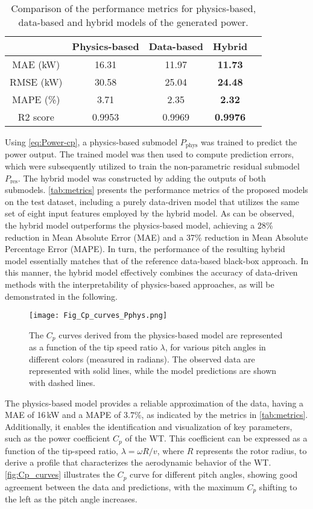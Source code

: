 \documentclass[preprint,12pt]{elsarticle}
\begin{document}
\begin{table}[t]
\centering
\begin{tabular}{|c|c|c|c|c|}
\cline{2-5} \cline{3-5} \cline{4-5} \cline{5-5} 
\multicolumn{1}{c|}{} & Physics-based & Data-based & Hybrid \tabularnewline
\hline 
MAE (kW) & 16.31 & 11.97 & \textbf{11.73} \tabularnewline
\hline 
RMSE (kW) & 30.58 & 25.04 & \textbf{24.48} \tabularnewline
\hline 
MAPE (\%) & 3.71 & 2.35 & \textbf{2.32} \tabularnewline
\hline 
R2 score & 0.9953 & 0.9969 & \textbf{0.9976} \tabularnewline
\hline 
\end{tabular}
\caption{Comparison of the performance metrics for physics-based, data-based and hybrid models of the generated power.}
\label{tab:metrics}
\end{table}

Using \autoref{eq:Power-cp}, a physics-based submodel $P_\text{phys}$ was trained to predict the power output. The trained model was then used to compute prediction errors, which were subsequently utilized to train the non-parametric residual submodel $P_\text{res}$. The hybrid model was constructed by adding the outputs of both submodels. \autoref{tab:metrics} presents the performance metrics of the proposed models on the test dataset, including a purely data-driven model that utilizes the same set of eight input features employed by the hybrid model. As can be observed,  the hybrid model outperforms the physics-based model, achieving a 28\% reduction in Mean Absolute Error (MAE) and a 37\% reduction in Mean Absolute Percentage Error (MAPE). In turn, the performance of the resulting hybrid model essentially matches that of the reference data-based black-box approach. In this manner, the hybrid model effectively combines the accuracy of data-driven methods with the interpretability of physics-based approaches, as will be demonstrated in the following.

\begin{figure}[t]
    \centering
    \texttt{[image: Fig\_Cp\_curves\_Pphys.png]}
    \caption{The $C_p$ curves derived from the physics-based model are represented as a function of the tip speed ratio $\lambda$, for various pitch angles in different colors (measured in radians). The observed data are represented with solid lines, while the model predictions are shown with dashed lines.}
    \label{fig:Cp_curves}
\end{figure}

The physics-based model provides a reliable approximation of the data, having a MAE of 16$\,$kW and a MAPE of $3.7$\%, as indicated by the metrics in \autoref{tab:metrics}. Additionally, it enables the identification and visualization of key parameters, such as the power coefficient $C_p$ of the WT. This coefficient can be expressed as a function of the tip-speed ratio, $\lambda=\omega R/v$, where $R$ represents the rotor radius, to derive a profile that characterizes the aerodynamic behavior of the WT. \autoref{fig:Cp_curves} illustrates the $C_p$ curve for different pitch angles, showing good agreement between the data and predictions, with the maximum $C_p$ shifting to the left as the pitch angle increases.
\end{document}
